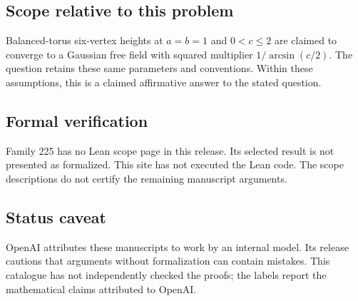 \documentclass[11pt]{article}
\begin{document}
\subsection{Scope relative to this problem}
Balanced-torus six-vertex heights at $a=b=1$ and $0<c\leq2$ are claimed to converge to a Gaussian free field with squared multiplier $1/\arcsin(c/2)$. The question retains these same parameters and conventions. Within these assumptions, this is a claimed affirmative answer to the stated question.

\subsection{Formal verification}
Family 225 has no Lean scope page in this release. Its selected result is not presented as formalized. This site has not executed the Lean code. The scope descriptions do not certify the remaining manuscript arguments.

\subsection{Status caveat}
OpenAI attributes these manuscripts to work by an internal model. Its release cautions that arguments without formalization can contain mistakes. This catalogue has not independently checked the proofs; the labels report the mathematical claims attributed to OpenAI.
\end{document}
